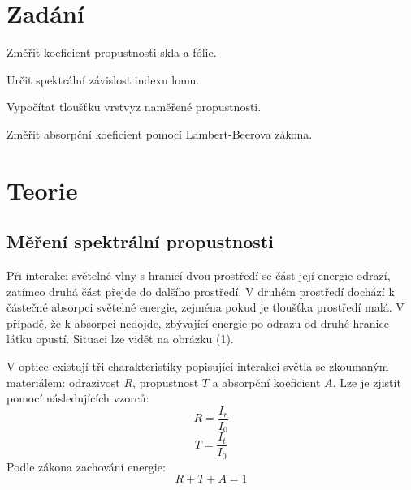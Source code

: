 \documentclass[a4paper,11pt]{article}
\begin{document}
\vskip1cm
    \begin{minipage}[t]{0.5\textwidth} 
        \section{Zadání}
            Změřit koeficient propustnosti skla a fólie.
            \par Určit spektrální závislost indexu lomu. 
            \par Vypočítat tloušťku vrstvyz naměřené propustnosti. 
            \par Změřit absorpční koeficient pomocí Lambert-Beerova zákona.
        \section{Teorie}
            \subsection{Měření spektrální propustnosti}
                Při interakci světelné vlny s hranicí dvou prostředí se část její energie odrazí, zatímco druhá část přejde do dalšího prostředí. V druhém prostředí dochází k částečné absorpci světelné energie, zejména pokud je tloušťka prostředí malá. V případě, že k absorpci nedojde, zbývající energie po odrazu od druhé hranice látku opustí. Situaci lze vidět na obrázku (1).
                \par V optice existují tři charakteristiky popisující interakci světla se zkoumaným materiálem: odrazivost $R$, propustnost $T$ a absorpční koeficient $A$. Lze je zjistit pomocí následujících vzorců: 
                \begin{equation}
                    R = \frac{I_r}{I_0} 
                \end{equation}
                \begin{equation}
                    T = \frac{I_t}{I_0}
                \end{equation}
                Podle zákona zachování energie:
                \begin{equation}
                    R + T + A = 1
                \end{equation}
    \end{minipage}
    \hspace{10pt}
\end{document}
